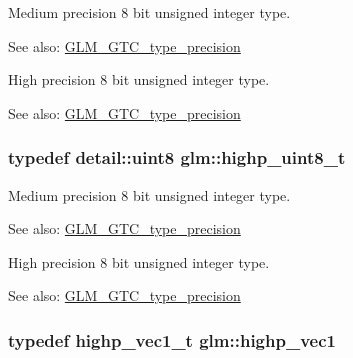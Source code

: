 Medium precision 8 bit unsigned integer type. \begin{Desc}
\item[See also:]\hyperlink{group__gtc__type__precision}{GLM\_\-GTC\_\-type\_\-precision}\end{Desc}
High precision 8 bit unsigned integer type. \begin{Desc}
\item[See also:]\hyperlink{group__gtc__type__precision}{GLM\_\-GTC\_\-type\_\-precision} \end{Desc}
\hypertarget{group__gtc__type__precision_g9ba529fcc75b82d23da979f0ce6e4518}{
\subsubsection[highp\_\-uint8\_\-t]{\setlength{\rightskip}{0pt plus 5cm}typedef detail::uint8 {\bf glm::highp\_\-uint8\_\-t}}}
\label{group__gtc__type__precision_g9ba529fcc75b82d23da979f0ce6e4518}


Medium precision 8 bit unsigned integer type. \begin{Desc}
\item[See also:]\hyperlink{group__gtc__type__precision}{GLM\_\-GTC\_\-type\_\-precision}\end{Desc}
High precision 8 bit unsigned integer type. \begin{Desc}
\item[See also:]\hyperlink{group__gtc__type__precision}{GLM\_\-GTC\_\-type\_\-precision} \end{Desc}
\hypertarget{group__gtc__type__precision_gb3f08c031846e7a95b49e81c48d920d3}{
\subsubsection[highp\_\-vec1]{\setlength{\rightskip}{0pt plus 5cm}typedef highp\_\-vec1\_\-t {\bf glm::highp\_\-vec1}}}
\label{group__gtc__type__precision_gb3f08c031846e7a95b49e81c48d920d3}


